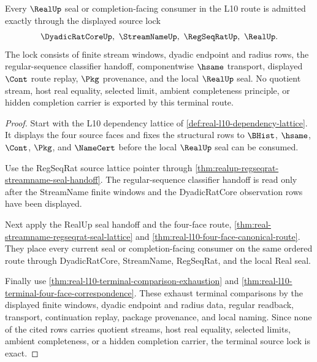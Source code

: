 \begin{theorem}
\label{thm:real-l10-terminal-source-lock}
Every $\RealUp$ seal or completion-facing consumer in the L10 route is admitted exactly through the displayed source lock
$$
\DyadicRatCoreUp,\ \StreamNameUp,\ \RegSeqRatUp,\ \RealUp.
$$
The lock consists of finite stream windows, dyadic endpoint and radius rows, the regular-sequence classifier handoff, componentwise $\hsame$ transport, displayed $\Cont$ route replay, $\Pkg$ provenance, and the local $\RealUp$ seal. No quotient stream, host real equality, selected limit, ambient completeness principle, or hidden completion carrier is exported by this terminal route.
\end{theorem}
\begin{proof}
Start with the L10 dependency lattice of \autoref{def:real-l10-dependency-lattice}. It displays the four source faces and fixes the structural rows to $\BHist$, $\hsame$, $\Cont$, $\Pkg$, and $\NameCert$ before the local $\RealUp$ seal can be consumed.

Use the RegSeqRat source lattice pointer through \autoref{thm:realup-regseqrat-streamname-seal-handoff}. The regular-sequence classifier handoff is read only after the StreamName finite windows and the DyadicRatCore observation rows have been displayed.

Next apply the RealUp seal handoff and the four-face route, \autoref{thm:real-streamname-regseqrat-seal-lattice} and \autoref{thm:real-l10-four-face-canonical-route}. They place every current seal or completion-facing consumer on the same ordered route through DyadicRatCore, StreamName, RegSeqRat, and the local Real seal.

Finally use \autoref{thm:real-l10-terminal-comparison-exhaustion} and \autoref{thm:real-l10-terminal-four-face-correspondence}. These exhaust terminal comparisons by the displayed finite windows, dyadic endpoint and radius data, regular readback, transport, continuation replay, package provenance, and local naming. Since none of the cited rows carries quotient streams, host real equality, selected limits, ambient completeness, or a hidden completion carrier, the terminal source lock is exact.
\end{proof}

